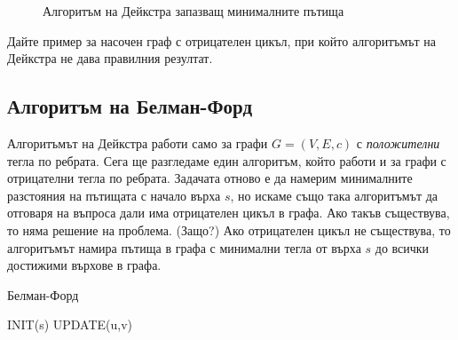 \begin{figure}[!htbp]
  
  \caption{Алгоритъм на Дейкстра запазващ минималните пътища}
  \label{fig:dijkstra-graph}
\end{figure}

\begin{problem}
  Дайте пример за насочен граф с отрицателен цикъл, при който алгоритъмът на Дейкстра не дава правилния резултат.
\end{problem}

\newpage
\subsection{Алгоритъм на Белман-Форд}

Алгоритъмът на Дейкстра работи само за графи $G = (V,E,c)$ с {\em положителни} тегла по ребрата.
Сега ще разгледаме един алгоритъм, който работи и за графи с отрицателни тегла по ребрата.
Задачата отново е да намерим минималните разстояния на пътищата с начало върха $s$, но
искаме също така алгоритъмът да отговаря на въпроса дали има отрицателен цикъл в графа. 
Ако такъв съществува, то няма решение на проблема. (Защо?)
Ако отрицателен цикъл не съществува, то алгоритъмът намира пътища в графа с минимални тегла от върха $s$
до всички достижими върхове в графа.


\begin{algorithm}
  \caption{Белман-Форд}
  \label{alg:belman-ford}
  
  \begin{algorithmic}[1]
    \STATE INIT(s)
    \STATE UPDATE(u,v)
    \ENDFOR
    \ENDFOR
    
    \RETURN \FALSE
    \ENDIF
    \ENDFOR
    \RETURN \TRUE
    
  \end{algorithmic}
\end{algorithm}


